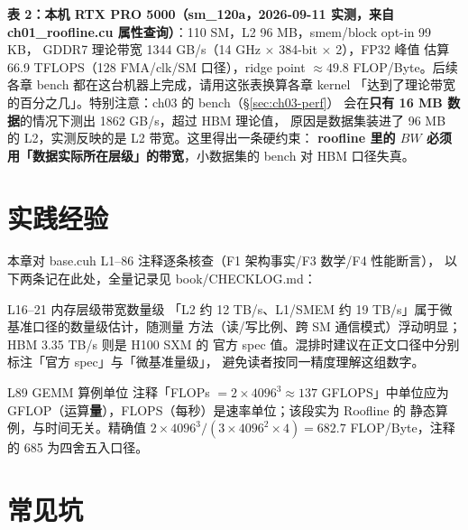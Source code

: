 \textbf{表 2：本机 RTX PRO 5000（sm\_120a，2026-09-11 实测，来自
ch01\_roofline.cu 属性查询）}：110 SM，L2 96 MB，smem/block opt-in 99 KB，
GDDR7 理论带宽 1344 GB/s（14 GHz $\times$ 384-bit $\times$ 2），FP32 峰值
估算 66.9 TFLOPS（128 FMA/clk/SM 口径），ridge point $\approx 49.8$
FLOP/Byte。后续各章 bench 都在这台机器上完成，请用这张表换算各章 kernel
「达到了理论带宽的百分之几」。特别注意：ch03 的 bench（\S\ref{sec:ch03-perf}）
会在\textbf{只有 16 MB 数据}的情况下测出 1862 GB/s，超过 HBM 理论值，
原因是数据集装进了 96 MB 的 L2，实测反映的是 L2 带宽。这里得出一条硬约束：
\textbf{roofline 里的 $BW$ 必须用「数据实际所在层级」的带宽}，小数据集的
bench 对 HBM 口径失真。

\section{实践经验}\label{sec:ch01-kaogu}

本章对 base.cuh L1--86 注释逐条核查（F1 架构事实/F3 数学/F4 性能断言），
以下两条记在此处，全量记录见 book/CHECKLOG.md：

\begin{kaogu}[F4]{L16--21 内存层级带宽数量级}
「L2 约 12 TB/s、L1/SMEM 约 19 TB/s」属于微基准口径的数量级估计，随测量
方法（读/写比例、跨 SM 通信模式）浮动明显；HBM 3.35 TB/s 则是 H100 SXM 的
官方 spec 值。混排时建议在正文口径中分别标注「官方 spec」与「微基准量级」，
避免读者按同一精度理解这组数字。
\end{kaogu}

\begin{kaogu}[F3]{L89 GEMM 算例单位}
注释「FLOPs $= 2 \times 4096^3 \approx 137$ GFLOPS」中单位应为
GFLOP（运算\textbf{量}），FLOPS（每秒）是速率单位；该段实为 Roofline 的
静态算例，与时间无关。精确值 $2 \times 4096^3 / (3 \times 4096^2 \times 4)
= 682.7$ FLOP/Byte，注释的 685 为四舍五入口径。
\end{kaogu}

\section{常见坑}\label{sec:ch01-pitfall}

